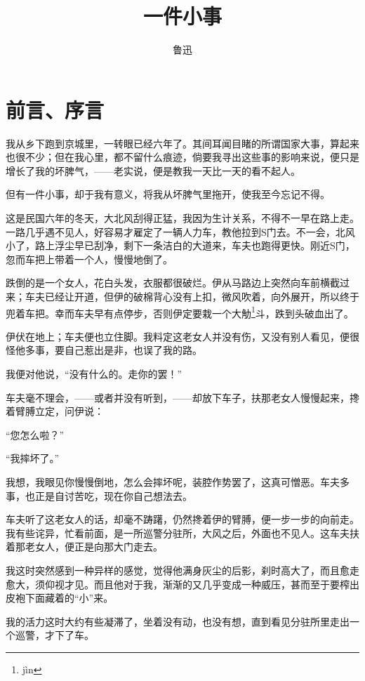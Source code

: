 \documentclass[12pt,UTF8]{ctexbook}
\title{\heiti\zihao{0} 一件小事}
\author{鲁迅}
\date{}
\begin{document}
\maketitle
\tableofcontents

\frontmatter
\chapter{前言、序言}

\mainmatter

我从乡下跑到京城里，一转眼已经六年了。其间耳闻目睹的所谓国家大事，算起来也很不少；但在我心里，都不留什么痕迹，倘要我寻出这些事的影响来说，便只是增长了我的坏脾气，——老实说，便是教我一天比一天的看不起人。

但有一件小事，却于我有意义，将我从坏脾气里拖开，使我至今忘记不得。

这是民国六年的冬天，大北风刮得正猛，我因为生计关系，不得不一早在路上走。一路几乎遇不见人，好容易才雇定了一辆人力车，教他拉到S门去。不一会，北风小了，路上浮尘早已刮净，剩下一条洁白的大道来，车夫也跑得更快。刚近S门，忽而车把上带着一个人，慢慢地倒了。

跌倒的是一个女人，花白头发，衣服都很破烂。伊从马路边上突然向车前横截过来；车夫已经让开道，但伊的破棉背心没有上扣，微风吹着，向外展开，所以终于兜着车把。幸而车夫早有点停步，否则伊定要栽一个大觔\footnote{j\`in}斗，跌到头破血出了。

伊伏在地上；车夫便也立住脚。我料定这老女人并没有伤，又没有别人看见，便很怪他多事，要自己惹出是非，也误了我的路。

我便对他说，“没有什么的。走你的罢！”

车夫毫不理会，——或者并没有听到，——却放下车子，扶那老女人慢慢起来，搀着臂膊立定，问伊说：

“您怎么啦？”

“我摔坏了。”

我想，我眼见你慢慢倒地，怎么会摔坏呢，装腔作势罢了，这真可憎恶。车夫多事，也正是自讨苦吃，现在你自己想法去。

车夫听了这老女人的话，却毫不踌躇，仍然搀着伊的臂膊，便一步一步的向前走。我有些诧异，忙看前面，是一所巡警分驻所，大风之后，外面也不见人。这车夫扶着那老女人，便正是向那大门走去。

我这时突然感到一种异样的感觉，觉得他满身灰尘的后影，刹时高大了，而且愈走愈大，须仰视才见。而且他对于我，渐渐的又几乎变成一种威压，甚而至于要榨出皮袍下面藏着的“小”来。

我的活力这时大约有些凝滞了，坐着没有动，也没有想，直到看见分驻所里走出一个巡警，才下了车。
\end{document}

